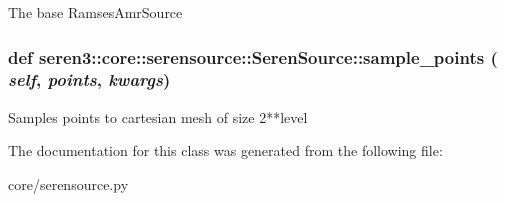 \label{classseren3_1_1core_1_1serensource_1_1SerenSource_ad2b95278d90d79af64d3c84d7add15df}
\begin{DoxyVerb}
The base RamsesAmrSource
\end{DoxyVerb}
 \hypertarget{classseren3_1_1core_1_1serensource_1_1SerenSource_ab3c3cdcbdca294f4336f425eb9d762e5}{
\subsubsection[{sample\_\-points}]{\setlength{\rightskip}{0pt plus 5cm}def seren3::core::serensource::SerenSource::sample\_\-points ( {\em self}, \/   {\em points}, \/   {\em kwargs})}}
\label{classseren3_1_1core_1_1serensource_1_1SerenSource_ab3c3cdcbdca294f4336f425eb9d762e5}
\begin{DoxyVerb}
Samples points to cartesian mesh of size 2**level
\end{DoxyVerb}
 

The documentation for this class was generated from the following file:\begin{DoxyCompactItemize}
\item 
core/serensource.py\end{DoxyCompactItemize}
